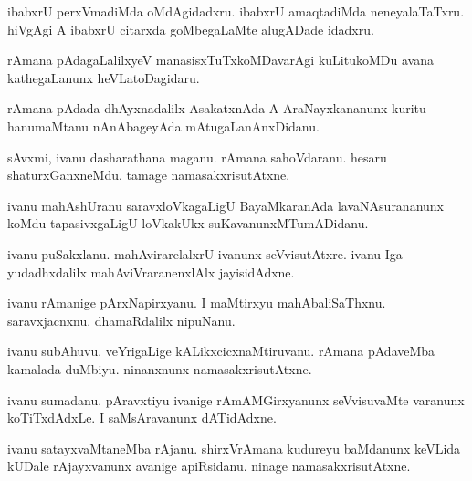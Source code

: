 \documentclass{article}
\begin{document}
\begin{mn}%
ibabxrU perxVmadiMda oMdAgidadxru. ibabxrU amaqtadiMda neneyalaTaTxru. hiVgAgi A ibabxrU 
citarxda goMbegaLaMte alugADade idadxru.
\end{mn}

\begin{mn}%
rAmana pAdagaLalilxyeV manasisxTuTxkoMDavarAgi kuLitukoMDu avana kathegaLanunx 
heVLatoDagidaru.
\end{mn}

\begin{mn}%
rAmana pAdada dhAyxnadalilx AsakatxnAda A AraNayxkananunx kuritu hanumaMtanu nAnAbageyAda 
mAtugaLanAnxDidanu.
\end{mn}

\begin{mn}%
sAvxmi, ivanu dasharathana maganu. rAmana sahoVdaranu. hesaru shaturxGanxneMdu. tamage 
namasakxrisutAtxne.
\end{mn}

\begin{mn}%
ivanu mahAshUranu saravxloVkagaLigU BayaMkaranAda lavaNAsurananunx koMdu tapasivxgaLigU 
loVkakUkx suKavanunxMTumADidanu.
\end{mn}

\begin{mn}%
ivanu puSakxlanu. mahAvirarelalxrU ivanunx seVvisutAtxre. ivanu Iga yudadhxdalilx 
mahAviVraranenxlAlx jayisidAdxne.
\end{mn}

\begin{mn}%
ivanu rAmanige pArxNapirxyanu. I maMtirxyu mahAbaliSaThxnu. saravxjacnxnu. dhamaRdalilx 
nipuNanu.
\end{mn}

\begin{mn}%
ivanu subAhuvu. veYrigaLige kALikxcicxnaMtiruvanu. rAmana pAdaveMba kamalada duMbiyu. 
ninanxnunx namasakxrisutAtxne.
\end{mn}

\begin{mn}%
ivanu sumadanu. pAravxtiyu ivanige rAmAMGirxyanunx seVvisuvaMte varanunx koTiTxdAdxLe. I 
saMsAravanunx dATidAdxne.
\end{mn}

\begin{mn}%
ivanu satayxvaMtaneMba rAjanu. shirxVrAmana kudureyu baMdanunx keVLida kUDale 
rAjayxvanunx avanige apiRsidanu. ninage namasakxrisutAtxne.
\end{mn}
\end{document}
